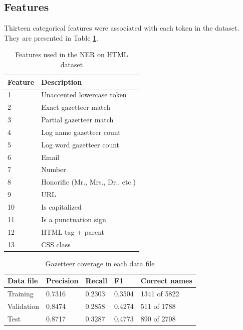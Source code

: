 \documentclass{nle}
\begin{document}
\subsection{Features}

Thirteen categorical features were associated with each token in the dataset. They 
are presented in Table \ref{tab:features}.

\begin{table}[h]
  \small
  \begin{center}
    \begin{tabular}{ ll }
      \toprule
      Feature & Description \\
      \midrule
      1  & Unaccented lowercase token \\
      2  & Exact gazetteer match \\
      3  & Partial gazetteer match \\
      4  & Log name gazetteer count\\
      5  & Log word gazetteer count\\
      6  & Email \\
      7  & Number \\
      8  & Honorific (Mr., Mrs., Dr., etc.)\\
      9  & URL \\
      10 & Is capitalized \\
      11 & Is a punctuation sign \\
      12 & HTML tag + parent \\
      13 & CSS class \\
      \bottomrule
    \end{tabular}
  \end{center}
  \caption{Features used in the NER on HTML dataset}
  \label{tab:features}
\end{table}

\begin{table}[h]
  \small
  \begin{center}
    \begin{tabular}{ lllll }
      \toprule
      Data file & Precision & Recall & F1 & Correct names \\
      \midrule
      Training   & 0.7316 & 0.2303 & 0.3504 & 1341 of 5822 \\ 
      Validation & 0.8474 & 0.2858 & 0.4274 & 511 of 1788 \\ 
      Test       & 0.8717 & 0.3287 & 0.4773 & 890 of 2708 \\ 
      \bottomrule
    \end{tabular}
  \end{center}
  \caption{Gazetteer coverage in each data file}
  \label{tab:gazetteer}
\end{table}
\end{document}
